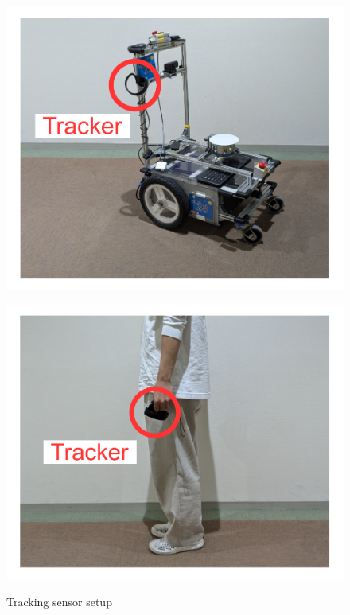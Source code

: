 \begin{figure}[H]
  \centering
  \begin{minipage}{0.42\textwidth}
    \centering
    \includegraphics[width=\textwidth]{images/tracking-robot.pdf}
    \label{fig:tracking-robot}
  \end{minipage}
  \begin{minipage}{0.42\textwidth}
    \centering
    \includegraphics[width=\textwidth]{images/tracking-ped.pdf}
    \label{fig:tracking-ped}
  \end{minipage}
  \caption{Tracking sensor setup}
  \label{fig:tracking}
\end{figure}

